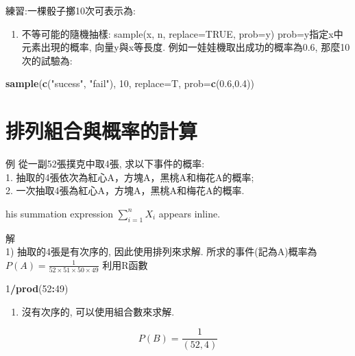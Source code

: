 \documentclass[]{book}
\newenvironment{Shaded}{\begin{snugshade}}{\end{snugshade}}
\newcommand{\DataTypeTok}[1]{\textcolor[rgb]{0.13,0.29,0.53}{#1}}
\newcommand{\DecValTok}[1]{\textcolor[rgb]{0.00,0.00,0.81}{#1}}
\newcommand{\FloatTok}[1]{\textcolor[rgb]{0.00,0.00,0.81}{#1}}
\newcommand{\KeywordTok}[1]{\textcolor[rgb]{0.13,0.29,0.53}{\textbf{#1}}}
\newcommand{\NormalTok}[1]{#1}
\newcommand{\OperatorTok}[1]{\textcolor[rgb]{0.81,0.36,0.00}{\textbf{#1}}}
\newcommand{\StringTok}[1]{\textcolor[rgb]{0.31,0.60,0.02}{#1}}
\providecommand{\tightlist}{%
  \setlength{\itemsep}{0pt}\setlength{\parskip}{0pt}}
\theoremstyle{definition}
\theoremstyle{definition}
\theoremstyle{definition}
\theoremstyle{remark}
\begin{document}
練習:一棵骰子擲10次可表示為:

\begin{enumerate}
\def\labelenumi{\arabic{enumi})}
\setcounter{enumi}{2}
\tightlist
\item
  不等可能的隨機抽樣: sample(x, n, replace=TRUE, prob=y)
  prob=y指定x中元素出現的概率, 向量y與x等長度.
  例如一娃娃機取出成功的概率為0.6, 那麼10次的試驗為:
\end{enumerate}

\begin{Shaded}
\begin{Highlighting}[]
\KeywordTok{sample}\NormalTok{(}\KeywordTok{c}\NormalTok{(}\StringTok{"sucess"}\NormalTok{, }\StringTok{"fail"}\NormalTok{), }\DecValTok{10}\NormalTok{, }\DataTypeTok{replace=}\NormalTok{T, }\DataTypeTok{prob=}\KeywordTok{c}\NormalTok{(}\FloatTok{0.6}\NormalTok{,}\FloatTok{0.4}\NormalTok{))}
\end{Highlighting}
\end{Shaded}

\section{排列組合與概率的計算}

例 從一副52張撲克中取4張, 求以下事件的概率:\\
1. 抽取的4張依次為紅心A，方塊A，黑桃A和梅花A的概率;\\
2. 一次抽取4張為紅心A，方塊A，黑桃A和梅花A的概率.

his summation expression \(\sum_{i=1}^n X_i\) appears inline.

解\\
1) 抽取的4張是有次序的, 因此使用排列來求解. 所求的事件(記為A)概率為
\(P(A)=\frac{1}{52 \times 51 \times 50 \times 49}\) 利用R函數

\begin{Shaded}
\begin{Highlighting}[]
\DecValTok{1}\OperatorTok{/}\KeywordTok{prod}\NormalTok{(}\DecValTok{52}\OperatorTok{:}\DecValTok{49}\NormalTok{)}
\end{Highlighting}
\end{Shaded}

\begin{enumerate}
\def\labelenumi{\arabic{enumi}.}
\setcounter{enumi}{1}
\tightlist
\item
  沒有次序的, 可以使用組合數來求解.
\end{enumerate}

\[ P(B)=\frac{1}{(52,4)} \]
\end{document}
